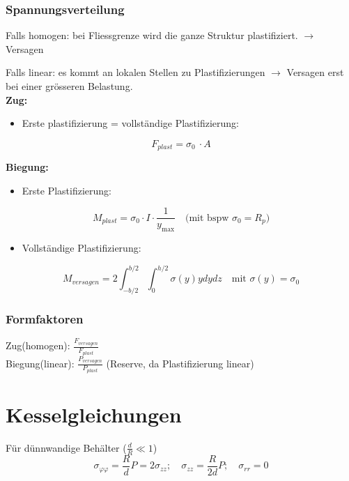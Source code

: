         \subsubsection{Spannungsverteilung}
            Falls homogen: bei Fliessgrenze wird die ganze Struktur plastifiziert. $\rightarrow$ Versagen %
              
            Falls linear: es kommt an lokalen Stellen zu Plastifizierungen $\rightarrow$ Versagen erst bei einer grösseren Belastung.\\
            \textbf{Zug:}
            \begin{itemize}
                \item Erste plastifizierung = vollständige Plastifizierung:
            \end{itemize}
            \[F_{plast} = \sigma_0\ \cdot A\]
            
            \textbf{Biegung:}
            \begin{itemize}
                \item Erste Plastifizierung:
            \end{itemize}
            \[M_{plast} = \sigma_0\cdot I\cdot\frac{1}{y_{\textrm{max}}} \quad\textrm{(mit bspw $\sigma_0 = R_p$)}\]
            \begin{itemize}
                \item Vollständige Plastifizierung:
            \end{itemize}
            \[M_{versagen} = 2\int_{-b/2}^{b/2}\int_{0}^{h/2}\sigma(y)ydydz \quad\textrm{mit $\sigma(y) = \sigma_0$}\]
            
        \columnbreak
        \subsubsection{Formfaktoren}
            Zug(homogen): $\frac{F_{versagen}}{F_{plast}}$\\
            Biegung(linear): $\frac{P_{versagen}}{P_{plast}}$ (Reserve, da Plastifizierung linear)
    \section{Kesselgleichungen}
        Für dünnwandige Behälter ($\frac{d}{R} \ll 1$)
        \vspace{-3mm}
        \[\sigma_{\varphi\varphi} = \frac{R}{d}P = 2\sigma_{zz}; \quad \sigma_{zz} = \frac{R}{2d}P; \quad \sigma_{rr}=0\]
            